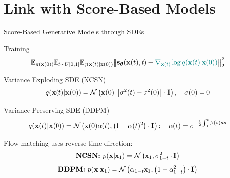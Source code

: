 \documentclass{beamer}
\begin{document}
\section{Link with Score-Based Models}
\begin{frame}{Score-Based Generative Models through SDEs}
	\vspace{-0.3cm}
	\begin{block}{Training}
		\vspace{-0.7cm}
		\[
			\mathbb{E}_{\pi(\mathbf{x}(0))} \mathbb{E}_{t \sim U[0, 1]} \mathbb{E}_{q(\mathbf{x}(t) | \mathbf{x}(0))}\bigl\| \mathbf{s}_{\boldsymbol{\theta}}(\mathbf{x}(t), t) - {\color{teal}\nabla_{\mathbf{x}(t)} \log q(\mathbf{x}(t) | \mathbf{x}(0))} \bigr\|^2_2 
		\]
		\vspace{-0.5cm}
	\end{block}
	\begin{block}{Variance Exploding SDE (NCSN)}
		\vspace{-0.3cm}
		\[
			q(\mathbf{x}(t) | \mathbf{x}(0)) = \mathcal{N}\left(\mathbf{x}(0), \left[\sigma^2(t) - \sigma^2(0)\right] \cdot \mathbf{I}\right), \quad \sigma(0) =0
		\]
		\vspace{-0.5cm}
	\end{block}
	\begin{block}{Variance Preserving SDE (DDPM)}
		\vspace{-0.5cm}
		\[
			q(\mathbf{x}(t) | \mathbf{x}(0)) = \mathcal{N}\left(\mathbf{x}(0) \alpha(t), \left(1 - \alpha(t)^2\right) \cdot \mathbf{I}\right); \quad \alpha(t) = e^{-\frac{1}{2} \int_0^t \beta(s) ds}
		\]
		\vspace{-0.5cm}
	\end{block}
	Flow matching uses reverse time direction:
	\[
		\textbf{NCSN: } p(\mathbf{x} | \mathbf{x}_1) = \mathcal{N}\left(\mathbf{x}_1, \sigma^2_{1-t} \cdot \mathbf{I}\right)
	\]
	\vspace{-0.5cm}
	\[
		\textbf{DDPM: } p(\mathbf{x} | \mathbf{x}_1) = \mathcal{N}\left(\alpha_{1-t} \mathbf{x}_1, \left(1 - \alpha_{1-t}^2\right) \cdot \mathbf{I}\right)
	\]
	\vspace{-0.5cm}
\end{frame}
\end{document}
